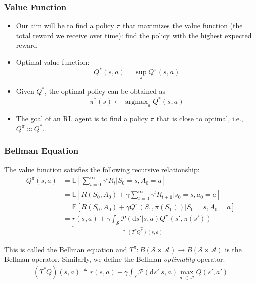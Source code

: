 \documentclass[handout]{beamer}
\newcommand{\eqdef}{\triangleq}
\newcommand{\EE}[1]{{\mathbb E}\left[#1\right]}
\newcommand{\Qopt}{Q^*}
\newcommand{\Qpi}{Q^\pi}
\newcommand{\Tpi}{T^\pi}
\newcommand{\Topt}{{T^*}}
\newcommand{\piopt}{{\pi^*}}
\newcommand{\argmax}{\mathop{\text{argmax}}}
\newcommand{\States}{\mathcal{S}}
\newcommand{\Actions}{\mathcal{A}}
\newcommand{\PKernel}{\mathcal{P}}
\newcommand{\SA}{\States\times\Actions}
\newcommand{\ds}{\mathrm{d}s}
\newcommand{\ra}{\rightarrow}
\begin{document}
\begin{frame}\frametitle{Value Function}\small

\begin{itemize}

	\item Our aim will be to find a policy $\pi$ that maximizes the value function (the total reward we receive over time): find the policy with the highest expected reward


	\item Optimal value function:
	\[
	  \Qopt(s,a) = \sup_\pi \Qpi(s,a)
	\]

	\item Given $\Qopt$, the optimal policy can be obtained as
	\[
	  \piopt(s) \leftarrow \argmax_a \Qopt(s,a)
	\]

	\item The goal of an RL agent is to find a policy $\pi$ that is close to optimal, i.e., $\Qpi \approx \Qopt$.
\end{itemize}

\end{frame}



\begin{frame}\frametitle{Bellman Equation}\small
The value function satisfies the following recursive relationship:
\begin{align*}
  \Qpi(s,a) & = \EE{\sum_{t=0}^\infty \gamma^t R_t | S_0 = s, A_0 = a }
  \\
  &
  = \EE{R(S_0, A_0) + \gamma \sum_{t = 0}^\infty \gamma^t R_{t+1} | s_0 = s, a_0 = a }
  \\
  &  
  = \EE{R(S_0, A_0) + \gamma \Qpi(S_1, \pi(S_1)) | S_0 = s, A_0 = a }
  \\
  &
  =
  \underbrace{
  r(s,a) + \gamma \int_\States \PKernel(\ds' | s, a) \Qpi (s', \pi(s')) }_{\eqdef (\Tpi \Qpi)(s,a) }
\end{align*}


This is called the Bellman equation and $\Tpi: B(\SA) \ra B(\SA)$ is the Bellman operator.
Similarly, we define the Bellman \emph{optimality} operator:
\begin{align*}
  (\Topt Q)(s,a) \eqdef r(s,a) + \gamma \int_\States \PKernel(\ds' | s,a) \max_{a' \in \Actions} Q(s',a')
\end{align*}
\end{frame}
\end{document}
